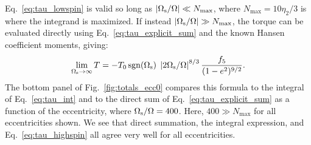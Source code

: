 \documentclass[
        fleqn,
        usenatbib,
    ]{mnras}
\newcommand*{\abs}[1]{\left|#1\right|}
\DeclareMathOperator*{\sgn}{sgn}
\begin{document}
Eq.~\eqref{eq:tau_lowspin} is valid so long as $\abs{\Omega_{\rm s} / \Omega} \ll
N_{\max}$, where $N_{\max} = 10 \eta_2/3$ is where the integrand is maximized.
If instead $\abs{\Omega_{\rm s} / \Omega} \gg N_{\max}$, the torque can be
evaluated directly using Eq.~\eqref{eq:tau_explicit_sum} and the known Hansen
coefficient moments, giving:
\begin{equation}
    \lim_{\Omega_{\rm s} \to \infty} T = -T_0 \sgn (\Omega_{\rm s})\;\left|2
        \Omega_{\rm s} / \Omega\right|^{8/3} \frac{f_5}{(1 -
        e^2)^{9/2}}.\label{eq:tau_highspin}
\end{equation}
The bottom panel of Fig.~\ref{fig:totals_ecc0} compares this formula to the
integral of Eq.~\eqref{eq:tau_int} and to the direct sum of
Eq.~\eqref{eq:tau_explicit_sum} as a function of the eccentricity, where
$\Omega_{\rm s} / \Omega = 400$. Here, $400 \gg N_{\max}$ for all eccentricities
shown. We see that direct summation, the integral expression, and
Eq.~\eqref{eq:tau_highspin} all agree very well for all eccentricities.
\end{document}
